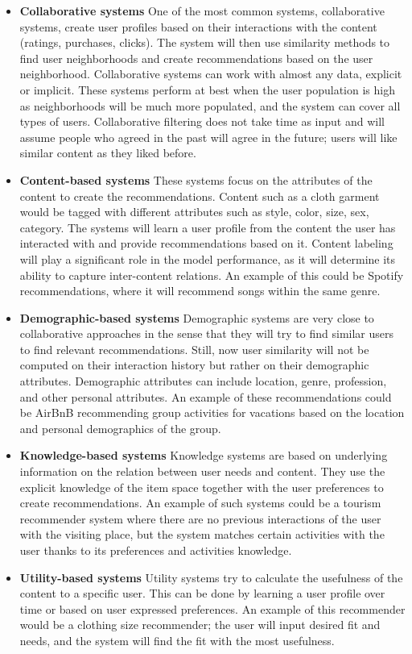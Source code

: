 \documentclass{kththesis}
\begin{document}
\begin{itemize}
    \item \textbf{Collaborative systems} One of the most common systems, collaborative systems, create user profiles based on their interactions with the content (ratings, purchases, clicks). The system will then use similarity methods to find user neighborhoods and create recommendations based on the user neighborhood. Collaborative systems can work with almost any data, explicit or implicit. These systems perform at best when the user population is high as neighborhoods will be much more populated, and the system can cover all types of users. Collaborative filtering does not take time as input and will assume people who agreed in the past will agree in the future; users will like similar content as they liked before.
    
    \item \textbf{Content-based systems}  These systems focus on the attributes of the content to create the recommendations. Content such as a cloth garment would be tagged with different attributes such as style, color, size, sex, category. The systems will learn a user profile from the content the user has interacted with and provide recommendations based on it. Content labeling will play a significant role in the model performance, as it will determine its ability to capture inter-content relations. An example of this could be Spotify recommendations, where it will recommend songs within the same genre. 
    
    \item \textbf{Demographic-based systems} Demographic systems are very close to collaborative approaches in the sense that they will try to find similar users to find relevant recommendations. Still, now user similarity will not be computed on their interaction history but rather on their demographic attributes. Demographic attributes can include location, genre, profession, and other personal attributes. An example of these recommendations could be AirBnB recommending group activities for vacations based on the location and personal demographics of the group.
    
    \item \textbf{Knowledge-based systems} Knowledge systems are based on underlying information on the relation between user needs and content. They use the explicit knowledge of the item space together with the user preferences to create recommendations. An example of such systems could be a tourism recommender system where there are no previous interactions of the user with the visiting place, but the system matches certain activities with the user thanks to its preferences and activities knowledge.
    
    \item \textbf{Utility-based systems} Utility systems try to calculate the usefulness of the content to a specific user. This can be done by learning a user profile over time or based on user expressed preferences. An example of this recommender would be a clothing size recommender; the user will input desired fit and needs, and the system will find the fit with the most usefulness.
    
\end{itemize}
\end{document}
